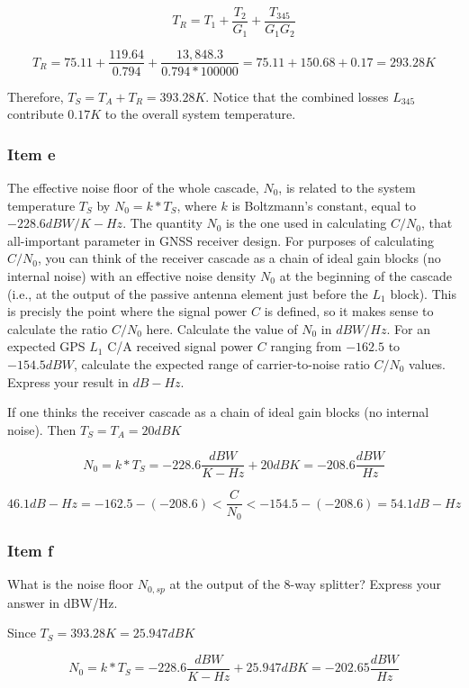 \begin{equation}
	T_R = T_1 + \frac{T_2}{G_1} + \frac{T_{345}}{G_1 G_2}
\end{equation}

\begin{equation}
	T_R = 75.11 + \frac{119.64}{0.794} + \frac{13,848.3}{0.794*100000}
	= 75.11 + 150.68 + 0.17
	= 293.28 K
\end{equation}

Therefore, $T_S = T_A + T_R = 393.28 K$. Notice that the combined losses
$L_{345}$ contribute $0.17 K$ to the overall system temperature.

\subsubsection{Item e}

The effective noise floor of the whole cascade, $N_0$, is related to the system
temperature $T_S$ by $N_0 = k * T_S$, where $k$ is Boltzmann’s constant, equal
to $-228.6 dBW/K-Hz$. The quantity $N_0$ is the one used in calculating $C/N_0$,
that all-important parameter in GNSS receiver design. For purposes of
calculating $C/N_0$, you can think of the receiver cascade as a chain of ideal
gain blocks (no internal noise) with an effective noise density $N_0$ at the
beginning of the cascade (i.e., at the output of the passive antenna element
just before the $L_1$ block). This is precisly the point where the signal power
$C$ is defined, so it makes sense to calculate the ratio $C/N_0$ here. Calculate
the value of $N_0$ in $dBW/Hz$. For an expected GPS $L_1$ C/A received signal
power $C$ ranging from $-162.5$ to $-154.5 dBW$, calculate the expected range of
carrier-to-noise ratio $C/N_0$ values. Express your result in $dB-Hz$.

If one thinks the receiver cascade as a chain of ideal gain blocks (no internal
noise). Then $T_S = T_A = 20 dBK$

\begin{equation}
	N_0 = k*T_S = -228.6 \frac{dBW}{K-Hz} + 20 dBK = -208.6 \frac{dBW}{Hz}
\end{equation}


\begin{equation}
	46.1 dB-Hz = -162.5 - (-208.6) < \frac{C}{N_0} < -154.5 - (-208.6) = 54.1 dB-Hz
\end{equation}

\subsubsection{Item f}

What is the noise floor $N_{0,sp}$ at the output of the 8-way splitter?
Express your answer in dBW/Hz.

Since $T_S = 393.28 K = 25.947 dBK$

\begin{equation}
	N_0 = k*T_S = -228.6 \frac{dBW}{K-Hz} + 25.947 dBK = -202.65 \frac{dBW}{Hz}
\end{equation}
